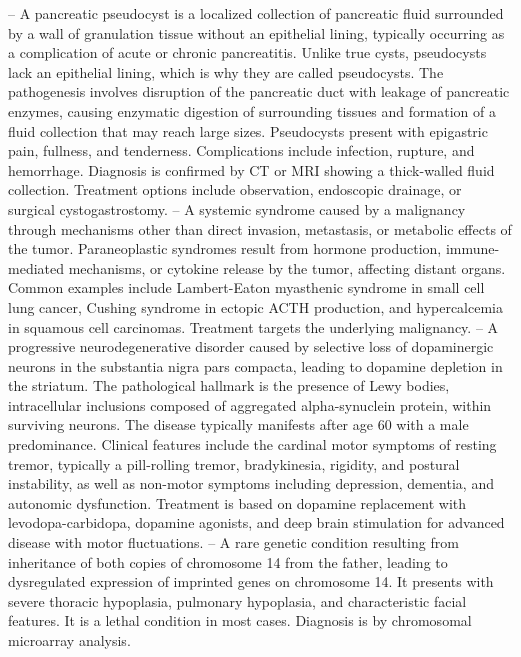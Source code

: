 -- A pancreatic pseudocyst is a localized collection of pancreatic fluid surrounded by a wall of granulation tissue without an epithelial lining, typically occurring as a complication of acute or chronic pancreatitis. Unlike true cysts, pseudocysts lack an epithelial lining, which is why they are called pseudocysts. The pathogenesis involves disruption of the pancreatic duct with leakage of pancreatic enzymes, causing enzymatic digestion of surrounding tissues and formation of a fluid collection that may reach large sizes. Pseudocysts present with epigastric pain, fullness, and tenderness. Complications include infection, rupture, and hemorrhage. Diagnosis is confirmed by CT or MRI showing a thick-walled fluid collection. Treatment options include observation, endoscopic drainage, or surgical cystogastrostomy.
-- A systemic syndrome caused by a malignancy through mechanisms other than direct invasion, metastasis, or metabolic effects of the tumor. Paraneoplastic syndromes result from hormone production, immune-mediated mechanisms, or cytokine release by the tumor, affecting distant organs. Common examples include Lambert-Eaton myasthenic syndrome in small cell lung cancer, Cushing syndrome in ectopic ACTH production, and hypercalcemia in squamous cell carcinomas. Treatment targets the underlying malignancy.
-- A progressive neurodegenerative disorder caused by selective loss of dopaminergic neurons in the substantia nigra pars compacta, leading to dopamine depletion in the striatum. The pathological hallmark is the presence of Lewy bodies, intracellular inclusions composed of aggregated alpha-synuclein protein, within surviving neurons. The disease typically manifests after age 60 with a male predominance. Clinical features include the cardinal motor symptoms of resting tremor, typically a pill-rolling tremor, bradykinesia, rigidity, and postural instability, as well as non-motor symptoms including depression, dementia, and autonomic dysfunction. Treatment is based on dopamine replacement with levodopa-carbidopa, dopamine agonists, and deep brain stimulation for advanced disease with motor fluctuations.
-- A rare genetic condition resulting from inheritance of both copies of chromosome 14 from the father, leading to dysregulated expression of imprinted genes on chromosome 14. It presents with severe thoracic hypoplasia, pulmonary hypoplasia, and characteristic facial features. It is a lethal condition in most cases. Diagnosis is by chromosomal microarray analysis.
